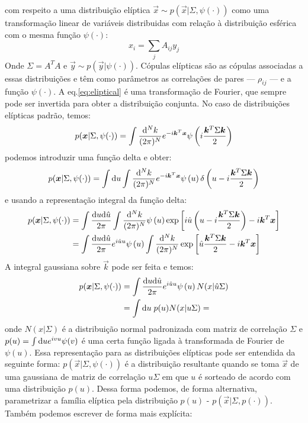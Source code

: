  com respeito a uma distribuição elíptica $\vec{x} \sim p(\vec{x} | \Sigma, \psi(\cdot))$ como uma transformação linear de variáveis distribuidas com relação à distribuição esférica com o mesma função $\psi(\cdot)$: 
\[
x_{i} = \sum_{j} A_{ij} y_{j} 
\]
Onde $\Sigma = A^{T}A$ e $\vec{y}\sim p(\vec{y}| \psi(\cdot))$. Cópulas elípticas são as cópulas associadas a essas distribuições e têm como parâmetros as correlações de pares --- $\rho_{ij}$ --- e a função $\psi(\cdot)$. A eq.\eqref{eq:eliptical} é uma transformação de Fourier, que sempre pode ser invertida para obter a distribuição conjunta. No caso de distribuições elípticas padrão, temos:
\[
p(\bm{x}| \Sigma, \psi(\cdot) )  = \int \frac{\mathrm{d}^N k}{(2\pi)^N} e^{-i\bm{k}^{T}\bm{x}} \psi\left(i\frac{\bm{k}^{T}\Sigma\bm{k}}{2}\right) 
\]
podemos introduzir uma função delta e obter:
\[
p(\bm{x}| \Sigma, \psi(\cdot) )  = \int \mathrm{d} u \int \frac{\mathrm{d}^N k}{(2\pi)^N} e^{-i\bm{k}^{T}\bm{x}} \psi\left(u\right) \delta\left(u - i\frac{\bm{k}^{T}\Sigma\bm{k}}{2}\right) 
\]
e usando a representação integral da função delta:
\begin{align*}
p(\bm{x}| \Sigma, \psi(\cdot) )  &= \int \frac{\mathrm{d} u \mathrm{d} \hat{u}}{2\pi} \int \frac{\mathrm{d}^N k}{(2\pi)^N}  \psi\left(u\right) \exp\left[i\hat{u}\left(u - i\frac{\bm{k}^{T}\Sigma\bm{k}}{2}\right)-i\bm{k}^{T}\bm{x}\right] \\
		     &= \int \frac{\mathrm{d} u \mathrm{d} \hat{u}}{2\pi} e^{i\hat{u}u}\psi\left(u\right) \int \frac{\mathrm{d}^N k}{(2\pi)^N}   \exp\left[\hat{u}\frac{\bm{k}^{T}\Sigma\bm{k}}{2}-i\bm{k}^{T}\bm{x}\right]
\end{align*}
A integral gaussiana sobre $\vec{k}$ pode ser feita e temos:
\begin{align*}
p(\bm{x}| \Sigma , \psi(\cdot))  &= \int \frac{\mathrm{d} u \mathrm{d} \hat{u}}{2\pi} e^{i\hat{u}u}\psi\left(u\right) N(x | \hat{u} \Sigma) \\
		     &= \int \mathrm{d} u \; p(u) N(x | u \Sigma)  = 
\end{align*}
onde $N(x|\Sigma)$ é a distribuição normal padronizada com matriz de correlação $\Sigma$ e $p(u) = \int \mathrm{d} u e^{ivu}\psi(v)$ é uma certa função ligada à transformada de Fourier de $\psi(u)$. Essa representação para as distribuições elípticas pode ser entendida da seguinte forma: $p(\vec{x} | \Sigma, \psi(\cdot))$ é a distribuição resultante quando se toma $\vec{x}$ de uma gaussiana de matriz de correlação $u\Sigma$ em que $u$ é sorteado de acordo com uma distribuição $p(u)$. Dessa forma podemos, de forma alternativa, parametrizar a família elíptica pela distribuição $p(u)$ - $p(\vec{x} | \Sigma, p(\cdot))$. Também podemos escrever de forma mais explícita:
